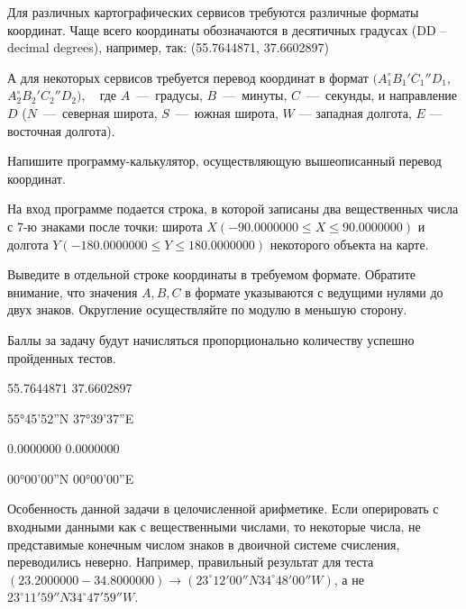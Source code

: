 
Для различных картографических сервисов требуются различные форматы координат. Чаще всего 
координаты обозначаются в десятичных градусах (DD -- decimal degrees), например, так:
(55.7644871, 37.6602897)  

А для некоторых сервисов требуется перевод координат в формат $(A_1^{\circ}B_1'C_1''D_1,$ $A_2^{\circ}B_2'C_2''D_2)$,  
где $A$~—~градусы, $B$~—~минуты, $C$~—~секунды, и направление $D$ ($N$~—~северная широта, $S$~—~южная широта,
 $W$  — западная долгота, $E$  — восточная долгота).
 
Напишите программу-калькулятор, осуществляющую вышеописанный перевод координат. 


На вход программе подается строка, в которой записаны два вещественных числа с 7-ю знаками после точки: широта 
$X(-90.0000000 \leq X \leq 90.0000000)$ и долгота $Y(-180.0000000 \leq Y \leq 180.0000000)$ некоторого объекта на карте.

\outputfmtSection

Выведите в отдельной строке координаты в требуемом формате. Обратите внимание, что значения $A , B , C$  в формате указываются с ведущими нулями до двух знаков. Округление осуществляйте по модулю в меньшую сторону.

\markSection

Баллы за задачу будут начисляться пропорционально количеству успешно пройденных тестов.


\begin{myverbbox}[\small]{\vinput}
    55.7644871 37.6602897
\end{myverbbox}
\begin{myverbbox}[\small]{\voutput}
   55°45'52''N 37°39'37''E
\end{myverbbox}


\begin{myverbbox}[\small]{\vinput}
    0.0000000 0.0000000
\end{myverbbox}
\begin{myverbbox}[\small]{\voutput}
   00°00'00''N 00°00'00''E
\end{myverbbox}

\solutionSection
Особенность данной задачи в целочисленной арифметике. Если оперировать с входными данными как с вещественными числами, то некоторые числа, не представимые конечным числом знаков в двоичной системе счисления, переводились неверно. Например, правильный результат для теста $(23.2000000 -34.8000000) \rightarrow (23^\circ12'00''N 34^\circ48'00''W)$, а не $23^\circ11'59''N 34^\circ47'59''W$.

